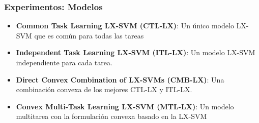\documentclass[aspectratio=43]{beamer}
\newcommand{\fmaxn}[1]{\textbf{#1}}
\newcommand{\fmod}[1]{\textsf{#1}}
\begin{document}



\begin{frame}
      \frametitle{Experimentos: Modelos}
  
  \begin{itemize}
      \item \textbf{Common Task Learning LX-SVM (\fmod{CTL-LX})}: Un único modelo LX-SVM que es común para todas las tareas
      \item \textbf{Independent Task Learning LX-SVM (\fmod{ITL-LX})}: Un modelo LX-SVM independiente para cada tarea.
      \item \textbf{Direct Convex Combination of LX-SVMs (\fmod{CMB-LX})}: Una combinación convexa de los mejores \fmod{CTL-LX} y \fmod{ITL-LX}.
      \item \textbf{Convex Multi-Task Learning LX-SVM (\fmod{MTL-LX})}: Un modelo multitarea con la formulación convexa basado en la LX-SVM
  
  \end{itemize}   
  
  \end{frame}
  
\end{document}
